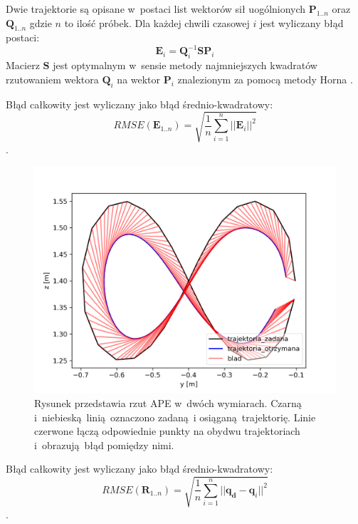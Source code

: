Dwie trajektorie są opisane w~postaci list wektorów sił uogólnionych $\boldsymbol{P}_{1..n}$ oraz $\boldsymbol{Q}_{1..n}$ gdzie $n$ to ilość próbek. Dla każdej chwili czasowej $i$ jest wyliczany błąd postaci:
\begin{equation}
\boldsymbol{E}_i = \boldsymbol{Q}_i^{-1}\boldsymbol{S}\boldsymbol{P}_i
\end{equation}
Macierz $\boldsymbol{S}$ jest optymalnym w~sensie metody najmniejszych kwadratów rzutowaniem wektora $\boldsymbol{Q}_i$ na wektor $\boldsymbol{P}_i$ znalezionym za pomocą metody Horna \cite{bib:horn}. 

Błąd całkowity jest wyliczany jako błąd średnio-kwadratowy:
\begin{equation}
RMSE(\boldsymbol{E}_{1..n}) = \sqrt{\frac{1}{n}\sum_{i=1}^{n}||\boldsymbol{E}_i||^2}
\end{equation}.



\begin{figure}
	\centering
		\includegraphics[width=.45\textwidth]{../../velma/przerobione_testy/out/osemka/yz_ate_plot_podnoszenie_miekki_bez_brak.png}
		\caption{Rysunek przedstawia rzut APE w~dwóch wymiarach. Czarną i~niebieską linią oznaczono zadaną i osiąganą trajektorię. Linie czerwone łączą odpowiednie punkty na obydwu trajektoriach i~obrazują błąd pomiędzy nimi.}
		\label{fig:przykl_ape}
\end{figure}




Błąd całkowity jest wyliczany jako błąd średnio-kwadratowy:
\begin{equation}
RMSE(\boldsymbol{R}_{1..n}) = \sqrt{\frac{1}{n}\sum_{i=1}^{n}||\boldsymbol{q_d}-\boldsymbol{q}_i||^2}
\end{equation}.

